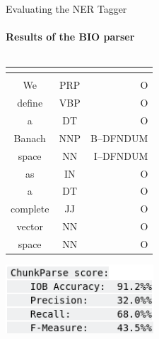\documentclass{beamer}
\begin{document}
\begin{frame}{Evaluating the NER Tagger} 
    \framesubtitle{Results of the BIO parser}
    \begin{columns}[T]
        \begin{column}{0.5\textwidth}
            \begin{tabular}{|c|c|r|}
                \hline
                \hline
        \multicolumn{2}{|c|}{\color{blue}{Input}} & \color{purple}{Output} \\
                \hline
                \hline
                \color{blue}{Token} & \color{blue}{POS} & \color{purple}{NER}\\
                \hline
                  We&PRP&O\\
                  \hline
                  define&VBP&O\\
                  \hline
                  a&DT&O\\
                  \hline
                  Banach&NNP&B--DFNDUM\\
                  \hline
                  space&NN&I--DFNDUM\\
                  \hline
                  as&IN&O\\
                  \hline
                  a&DT&O\\
                  \hline
                  complete&JJ&O\\
                  \hline
                  vector&NN&O\\
                  \hline
                  space&NN&O\\
                  \hline
            \end{tabular}
    \includegraphics[width=0.6\textwidth]{BIO_stats.png}
        \end{column}
        \begin{column}{0.5\textwidth}
            
        \end{column}
    \end{columns}
\end{frame}
\end{document}
